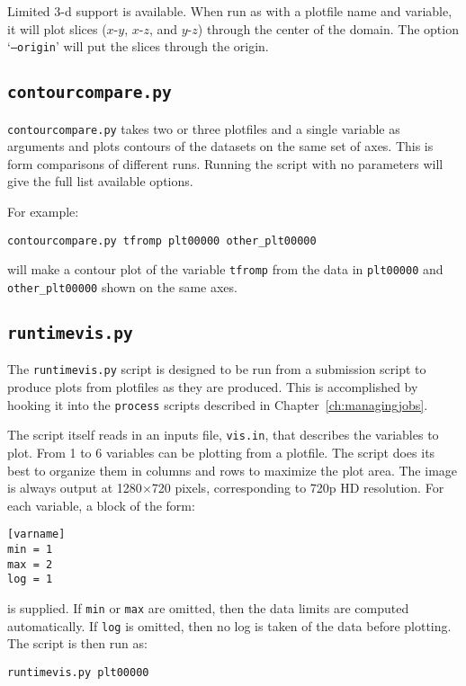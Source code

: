Limited 3-d support is available.  When run as with a plotfile name
and variable, it will plot slices ($x$-$y$, $x$-$z$, and $y$-$z$) 
through the center of the domain.  The option `{\tt --origin}'
will put the slices through the origin.


\subsection{\tt contourcompare.py}

{\tt contourcompare.py} takes two or three plotfiles and a single variable as arguments
and plots contours of the datasets on the same set of axes.  This is 
form comparisons of different runs.  Running the script with no parameters
will give the full list available options.

For example:
\begin{verbatim}
contourcompare.py tfromp plt00000 other_plt00000
\end{verbatim}
will make a contour plot of the variable {\tt tfromp} from the data in
{\tt plt00000} and {\tt other\_plt00000} shown on the same axes.  


\subsection{\tt runtimevis.py}

The {\tt runtimevis.py} script is designed to be run from a submission
script to produce plots from plotfiles as they are produced.  This is
accomplished by hooking it into the {\tt process} scripts described in
Chapter~\ref{ch:managingjobs}.

The script itself reads in an inputs file, {\tt vis.in}, that
describes the variables to plot.  From 1 to 6 variables can be
plotting from a plotfile.  The script does its best to organize them
in columns and rows to maximize the plot area.  The image is always
output at 1280$\times$720 pixels, corresponding to 720p HD resolution.
For each variable, a block of the form:
\begin{verbatim}
[varname]
min = 1
max = 2
log = 1
\end{verbatim}
is supplied.  If {\tt min} or {\tt max} are omitted, then the data
limits are computed automatically.  If {\tt log} is omitted, then no
log is taken of the data before plotting.  The script is then run as:
\begin{verbatim}
runtimevis.py plt00000
\end{verbatim}



